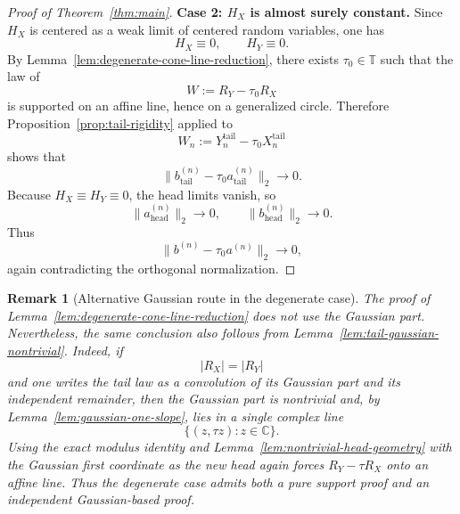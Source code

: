 \documentclass[11pt]{amsart}
\newtheorem{remark}[theorem]{Remark}
\newcommand{\C}{\mathbb{C}}
\newcommand{\T}{\mathbb{T}}
\begin{document}
\begin{proof}[Proof of Theorem~\ref{thm:main}]
\medskip
\noindent
\textbf{Case 2: $H_X$ is almost surely constant.}
Since $H_X$ is centered as a weak limit of centered random variables, one has
\[
  H_X\equiv 0,
  \qquad
  H_Y\equiv 0.
\]
By Lemma~\ref{lem:degenerate-cone-line-reduction}, there exists $\tau_0\in\T$
such that the law of
\[
  W:=R_Y-\tau_0 R_X
\]
is supported on an affine line, hence on a generalized circle.  Therefore
Proposition~\ref{prop:tail-rigidity} applied to
\[
  W_n:=Y_n^{\mathrm{tail}}-\tau_0 X_n^{\mathrm{tail}}
\]
shows that
\[
  \|b^{(n)}_{\mathrm{tail}}-\tau_0 a^{(n)}_{\mathrm{tail}}\|_2\longrightarrow 0.
\]
Because $H_X\equiv H_Y\equiv 0$, the head limits vanish, so
\[
  \|a^{(n)}_{\mathrm{head}}\|_2\longrightarrow 0,
  \qquad
  \|b^{(n)}_{\mathrm{head}}\|_2\longrightarrow 0.
\]
Thus
\[
  \|b^{(n)}-\tau_0 a^{(n)}\|_2\longrightarrow 0,
\]
again contradicting the orthogonal normalization.
\end{proof}

\begin{remark}[Alternative Gaussian route in the degenerate case]
The proof of Lemma~\ref{lem:degenerate-cone-line-reduction} does not use the
Gaussian part.  Nevertheless, the same conclusion also follows from
Lemma~\ref{lem:tail-gaussian-nontrivial}.  Indeed, if
\[
  |R_X|=|R_Y|
\]
and one writes the tail law as a convolution of its Gaussian part and its
independent remainder, then the Gaussian part is nontrivial and, by
Lemma~\ref{lem:gaussian-one-slope}, lies in a single complex line
\[
  \{(z,\tau z): z\in\C\}.
\]
Using the exact modulus identity and Lemma~\ref{lem:nontrivial-head-geometry}
with the Gaussian first coordinate as the new head again forces
$R_Y-\tau R_X$ onto an affine line.  Thus the degenerate case admits both a
pure support proof and an independent Gaussian-based proof.
\end{remark}
\end{document}
